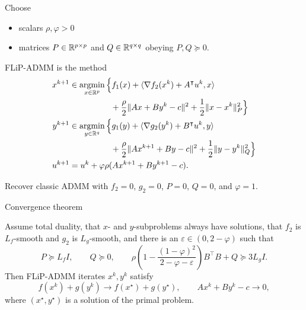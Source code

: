 \documentclass[10pt,mathserif]{beamer}
\begin{document}
\begin{frame}
Choose 
\begin{itemize}
  \item scalars $\rho,\varphi>0$
  \item matrices $P\in \mathbb{R}^{p\times p}$ and $Q\in \mathbb{R}^{q\times q}$ obeying $P,Q\succeq 0$.
\end{itemize}
\medskip\pause

FLiP-ADMM is the method
\begin{align*}
 x^{k+1} &\in \operatorname*{argmin}_{x\in \mathbb{R}^p} \Big\{f_1(x) + \langle \nabla f_2(x^k) + A^\intercal  u^k, x\rangle \\
 &\hspace{50pt} + \frac{\rho}{2}\|Ax+By^k-c\|^2 + \frac{1}{2}\|x-x^k\|_P^2\Big\}\\
 y^{k+1} &\in \operatorname*{argmin}_{y\in \mathbb{R}^q} \Big\{g_1(y) + \langle \nabla g_2(y^k) + B^\intercal  u^k, y\rangle \\
 &\hspace{50pt} + \frac{\rho}{2}\|Ax^{k+1}+By-c\|^2 + \frac{1}{2}\|y-y^k\|_Q^2\Big\}\\
 u^{k+1} &= u^k + \varphi\rho(Ax^{k+1}+By^{k+1}-c).
\end{align*}
\medskip

Recover classic ADMM with $f_2=0$, $g_2=0$, $P=0$, $Q=0$, and $\varphi = 1$.
\end{frame}

\begin{frame}{Convergence theorem}
\setcounter{theorem}{5}
\begin{theorem}
\label{thm:FLiP-ADMM}
Assume total duality, that $x$- and $y$-subproblems always have solutions,
that $f_2$ is $L_f$-smooth and $g_2$ is $L_g$-smooth,
and there is an $\varepsilon\in(0,2-\varphi)$ such that
\[
P \succeq L_f I,
\qquad
Q\succeq 0,
\qquad
 \rho\left(1-\frac{(1-\varphi)^2}{2-\varphi-\varepsilon}\right) B^\intercal  B + Q \succeq  3L_g I.
\]
Then FLiP-ADMM iterates $x^k,y^k$ satisfy
\[
f(x^k)+g(y^k)\rightarrow f(x^\star)+g(y^\star),\qquad
Ax^k+By^k-c\rightarrow 0,
\]
where $(x^\star,y^\star)$ is a solution of the primal problem.
\end{theorem}
\end{frame}
\end{document}
